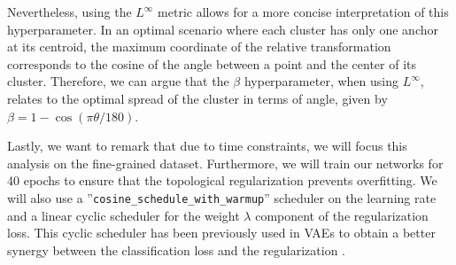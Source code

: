 \documentclass[../main.tex]{subfiles}
\begin{document}
\begin{enumerate}
   Nevertheless, using the $L^\infty$ metric allows for a more concise interpretation of this hyperparameter. In an optimal scenario where each cluster has only one anchor at its centroid, the maximum coordinate of the relative transformation corresponds to the cosine of the angle between a point and the center of its cluster. Therefore, we can argue that the $\beta$ hyperparameter, when using $L^\infty$, relates to the optimal spread of the cluster in terms of angle, given by $\beta = 1 - \cos(\pi\theta/180)$.
\end{enumerate}


Lastly, we want to remark that due to time constraints, we will focus this analysis on the fine-grained dataset. Furthermore, we will train our networks for 40 epochs to ensure that the topological regularization prevents overfitting. We will also use a ''\texttt{cosine\_schedule\_with\_warmup}'' scheduler on the learning rate and a linear cyclic scheduler for the weight $\lambda$ component of the regularization loss. This cyclic scheduler has been previously used in VAEs to obtain a better synergy between the classification loss and the regularization \cite{fu_cyclical_2019}.
\end{document}
